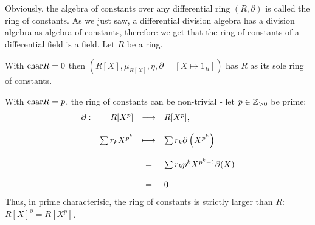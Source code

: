 \en
\bmk Obviously, the algebra of constants over any differential ring $(R, \partial)$ is called the ring of constants. As we just saw, a differential division algebra has a division algebra as algebra of constants, therefore we get that the ring of constants of a differential field is a field.
\bsp Let $R$ be a ring.
\bn
\item With $\chr R = 0$ then $\left(R[X],\mu_{R[X]}, \eta, \partial = \left[X \longmapsto 1_R\right]\right)$ has $R$ as its sole ring of constants.
\item With $\chr R = p$, the ring of constants can be non-trivial - let $p \in \zz_{>0}$ be prime:
$$
\bao{rrcl}
\partial : &R[X^p] &\longrightarrow& R[X^p],\\
&&&\\
&\sum r_k X^{p^k}& \longmapsto& \sum r_k \partial\left(X^{p^k}\right)\\
&&&\\
&& = & \sum r_k p^k X^{p^k-1}\partial(X)\\
&&&\\
&&=& 0\\
\ea$$
Thus, in prime characterisic, the ring of constants is strictly larger than $R$: $R[X]^\partial = R[X^p]$.
\en
